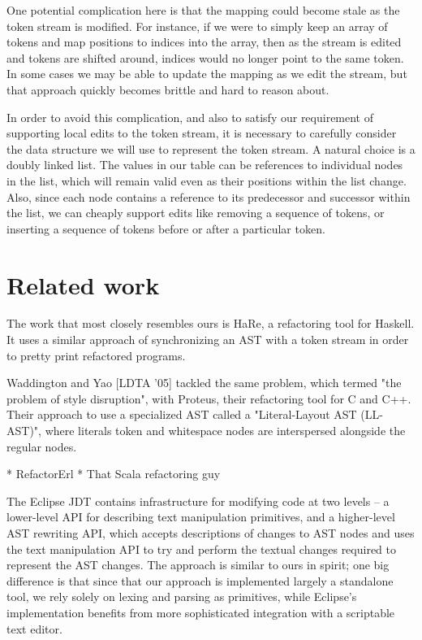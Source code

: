 One potential complication here is that the mapping could become stale as the
token stream is modified. For instance, if we were to simply keep an array of
tokens and map positions to indices into the array, then as the stream is
edited and tokens are shifted around, indices would no longer point to the same
token. In some cases we may be able to update the mapping as we edit the
stream, but that approach quickly becomes brittle and hard to reason about.

In order to avoid this complication, and also to satisfy our requirement of
supporting local edits to the token stream, it is necessary to carefully
consider the data structure we will use to represent the token stream. A
natural choice is a doubly linked list. The values in our table can be
references to individual nodes in the list, which will remain valid even as
their positions within the list change. Also, since each node contains a
reference to its predecessor and successor within the list, we can cheaply
support edits like removing a sequence of tokens, or inserting a sequence of
tokens before or after a particular token.

\section{Related work}

The work that most closely resembles ours is HaRe, a refactoring tool for
Haskell.  It uses a similar approach of synchronizing an AST with a token
stream in order to pretty print refactored programs.

Waddington and Yao [LDTA '05] tackled the same problem, which termed "the
problem of style disruption", with Proteus, their refactoring tool for C and
C++. Their approach to use a specialized AST called a "Literal-Layout AST
(LL-AST)", where literals token and whitespace nodes are interspersed alongside
the regular nodes.

* RefactorErl * That Scala refactoring guy


The Eclipse JDT contains infrastructure for modifying code at two levels -- a
lower-level API for describing text manipulation primitives, and a higher-level
AST rewriting API, which accepts descriptions of changes to AST nodes and uses
the text manipulation API to try and perform the textual changes required to
represent the AST changes. The approach is similar to ours in spirit; one big
difference is that since that our approach is implemented largely a standalone
tool, we rely solely on lexing and parsing as primitives, while Eclipse's
implementation benefits from more sophisticated integration with a scriptable
text editor.
